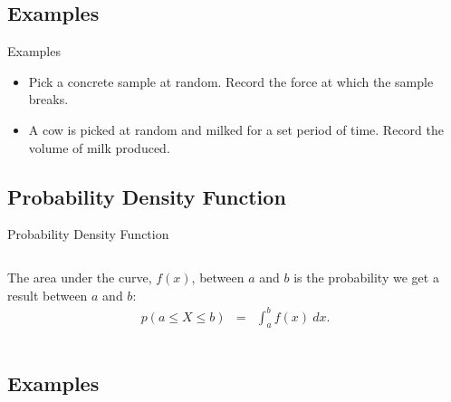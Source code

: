 \subsection{Examples}

\begin{frame}{Examples}

  \begin{itemize}
  \item Pick a concrete sample at random. Record the force at which
    the sample breaks.
  \item A cow is picked at random and milked for a set period of
    time. Record the volume of milk produced.
  \end{itemize}
  
\end{frame}

\subsection{Probability Density Function}

\begin{frame}{Probability Density Function}

  
  \begin{columns}

    \begin{definition}
      The area under the curve, $f(x)$, between $a$ and $b$ is the
      probability we get a result between $a$ and $b$:
      \begin{eqnarray*}
        p( a \leq X \leq b ) & = & \int^b_a f(x) ~ dx.
      \end{eqnarray*}
    \end{definition}


  \end{columns}
  
\end{frame}

\subsection{Examples}

